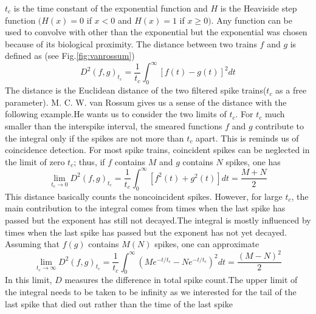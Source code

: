 \documentclass[12pt]{report}
\begin{document}
$t_{c}$ is the time constant of the exponential function and $H$ is the Heaviside step function $(H(x)=0$ if $x<0$ and $H(x)=1$ if $x \geq 0) .$  Any function can be used to convolve with other than the exponential but the exponential was chosen because of its biological proximity. The distance between two trains $f$ and $g$ is defined as (see Fig.\ref{fig:vanrossum})
\begin{equation}
D^{2}(f, g)_{t_{c}}=\frac{1}{t_{c}} \int_{0}^{\infty}[f(t)-g(t)]^{2} d t
\end{equation}
The distance is the Euclidean distance of the two filtered spike trains($t_{c}$ as a free parameter).
M. C. W. van Rossum gives us a sense of the distance with the following example.He wants us to consider the two limits of $t_{c} .$ For $t_{c}$ much smaller than the interspike interval, the smeared functions $f$ and $g$ contribute to the integral only if the spikes are not more than $t_{c}$ apart. This is reminds us of coincidence detection. For most spike trains, coincident spikes can be neglected in the limit of zero $t_{c}$; thus, if $f$ contains $M$ and $g$ contains $N$ spikes, one has
\begin{equation}
\lim _{t_{c} \rightarrow 0} D^{2}(f, g)_{t_{c}}=\frac{1}{t_{c}} \int_{0}^{\infty}\left[f^{2}(t)+g^{2}(t)\right] d t=\frac{M+N}{2}
\end{equation}
This distance basically counts the noncoincident spikes.
However, for large $t_{c}$, the main contribution to the integral comes from times when the last spike has passed but the exponent has still not decayed.The integral is mostly influenced by times when the last spike has passed but the exponent has not yet decayed. Assuming that $f(g)$ contains $M(N)$ spikes, one can approximate
\begin{equation}
\lim _{t_{c} \rightarrow \infty} D^{2}(f, g)_{t_{c}}=\frac{1}{t_{c}} \int_{0}^{\infty}\left(M e^{-t / t_{\mathrm{c}}}-N e^{-t / t_{c}}\right)^{2} d t=\frac{(M-N)^{2}}{2}
\end{equation}
In this limit, $D$ measures the difference in total spike count.The upper limit of the integral needs to be taken to be infinity as we interested for the tail of the last spike that died out rather than the time of the last spike
\end{document}
